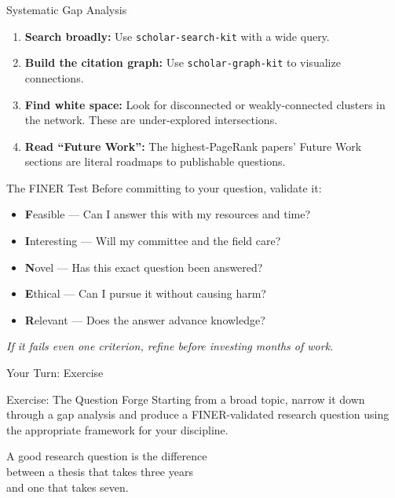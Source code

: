 \documentclass[aspectratio=169]{beamer}
\begin{document}
\begin{frame}{Systematic Gap Analysis}
  \begin{enumerate}
    \item \textbf{Search broadly:} Use \texttt{scholar-search-kit} with a wide query.
    \item \textbf{Build the citation graph:} Use \texttt{scholar-graph-kit} to visualize connections.
    \item \textbf{Find white space:} Look for disconnected or weakly-connected clusters in the network. These are under-explored intersections.
    \item \textbf{Read ``Future Work'':} The highest-PageRank papers' Future Work sections are literal roadmaps to publishable questions.
  \end{enumerate}
\end{frame}

\begin{frame}{The FINER Test}
  Before committing to your question, validate it:
  \vspace{0.3cm}
  \begin{itemize}
    \item[\ding{51}] \textbf{F}easible --- Can I answer this with my resources and time?
    \item[\ding{51}] \textbf{I}nteresting --- Will my committee and the field care?
    \item[\ding{51}] \textbf{N}ovel --- Has this exact question been answered?
    \item[\ding{51}] \textbf{E}thical --- Can I pursue it without causing harm?
    \item[\ding{51}] \textbf{R}elevant --- Does the answer advance knowledge?
  \end{itemize}
  \vspace{0.3cm}
  \textit{If it fails even one criterion, refine before investing months of work.}
\end{frame}

\begin{frame}{Your Turn: Exercise}
  \begin{exampleblock}{Exercise: The Question Forge}
    Starting from a broad topic, narrow it down through a gap analysis and produce a FINER-validated research question using the appropriate framework for your discipline.
  \end{exampleblock}
\end{frame}

\begin{frame}[standout]
  A good research question is the difference\\
  between a thesis that takes three years\\
  and one that takes seven.
\end{frame}
\end{document}
